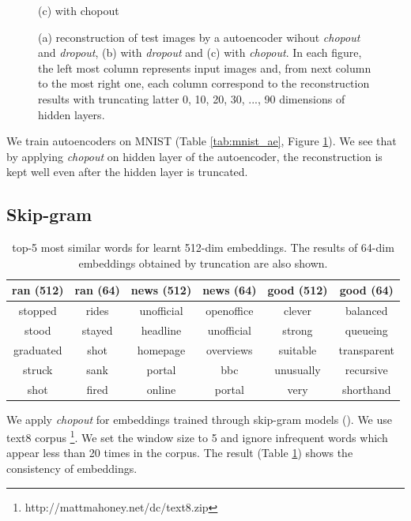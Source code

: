 \documentclass{article}
\begin{document}
\begin{figure}
\begin{minipage}{0.33\linewidth}
\begin{center}
        \hspace{1.6cm} (c) with chopout
      \end{center}
    \end{minipage}    
    \caption{(a) reconstruction of test images by a autoencoder wihout \textit{chopout} and \textit{dropout}, (b) with \textit{dropout} and (c) with \textit{chopout}. 
    In each figure, the left most column represents input images and, from next column to the most right one, each column correspond to the reconstruction results with truncating latter 0, 10, 20, 30, ..., 90 dimensions of hidden layers.}
    \label{fig:mnist_ae}
    \end{figure}
    
    We train autoencoders on MNIST (Table \ref{tab:mnist_ae}, Figure \ref{fig:mnist_ae}). We see that by applying \textit{chopout} on hidden layer of the autoencoder, the reconstruction is kept well even after the hidden layer is truncated.
    
    \subsection{Skip-gram}
    
    \begin{table}[h]
        \caption{top-5 most similar words for learnt 512-dim embeddings. The results of 64-dim embeddings obtained by truncation are also shown.}    
        \centering
        \begin{tabular}{c|c|c|c|c|c}
            ran (512) & ran (64) & news (512) & news (64) & good (512) & good (64) \\ \hline \hline
            stopped & rides & unofficial & openoffice & clever & balanced \\
            stood & stayed & headline & unofficial & strong & queueing \\
            graduated & shot & homepage & overviews & suitable & transparent \\
            struck & sank & portal & bbc & unusually & recursive \\
            shot & fired & online & portal & very & shorthand \\
        \end{tabular}
        \label{tab:skip_gram}
    \end{table}    
    
    We apply \textit{chopout} for embeddings trained through skip-gram models (\citet{mikolov2013efficient, mikolov2013distributed}). We use text8 corpus \footnote{http://mattmahoney.net/dc/text8.zip}. We set the window size to 5 and ignore infrequent words which appear less than 20 times in the corpus. The result (Table \ref{tab:skip_gram}) shows the consistency of embeddings.
\end{document}
